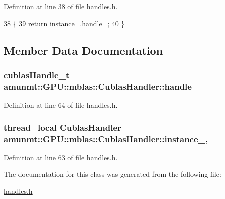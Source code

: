 Definition at line 38 of file handles.\+h.


\begin{DoxyCode}
38                                        \{
39         \textcolor{keywordflow}{return} \hyperlink{classamunmt_1_1GPU_1_1mblas_1_1CublasHandler_a75aae236b136e113a77b90f42a53ce44}{instance\_}.\hyperlink{classamunmt_1_1GPU_1_1mblas_1_1CublasHandler_a2e032d5257f286f3f829b5e684525121}{handle\_};
40     \}
\end{DoxyCode}


\subsection{Member Data Documentation}
\subsubsection[{\texorpdfstring{handle\+\_\+}{handle_}}]{\setlength{\rightskip}{0pt plus 5cm}cublas\+Handle\+\_\+t amunmt\+::\+G\+P\+U\+::mblas\+::\+Cublas\+Handler\+::handle\+\_\+\hspace{0.3cm}{\ttfamily [private]}}\hypertarget{classamunmt_1_1GPU_1_1mblas_1_1CublasHandler_a2e032d5257f286f3f829b5e684525121}{}\label{classamunmt_1_1GPU_1_1mblas_1_1CublasHandler_a2e032d5257f286f3f829b5e684525121}


Definition at line 64 of file handles.\+h.

\subsubsection[{\texorpdfstring{instance\+\_\+}{instance_}}]{\setlength{\rightskip}{0pt plus 5cm}thread\+\_\+local {\bf Cublas\+Handler} amunmt\+::\+G\+P\+U\+::mblas\+::\+Cublas\+Handler\+::instance\+\_\+\hspace{0.3cm}{\ttfamily [static]}, {\ttfamily [private]}}\hypertarget{classamunmt_1_1GPU_1_1mblas_1_1CublasHandler_a75aae236b136e113a77b90f42a53ce44}{}\label{classamunmt_1_1GPU_1_1mblas_1_1CublasHandler_a75aae236b136e113a77b90f42a53ce44}


Definition at line 63 of file handles.\+h.



The documentation for this class was generated from the following file\+:\begin{DoxyCompactItemize}
\item 
\hyperlink{handles_8h}{handles.\+h}\end{DoxyCompactItemize}
